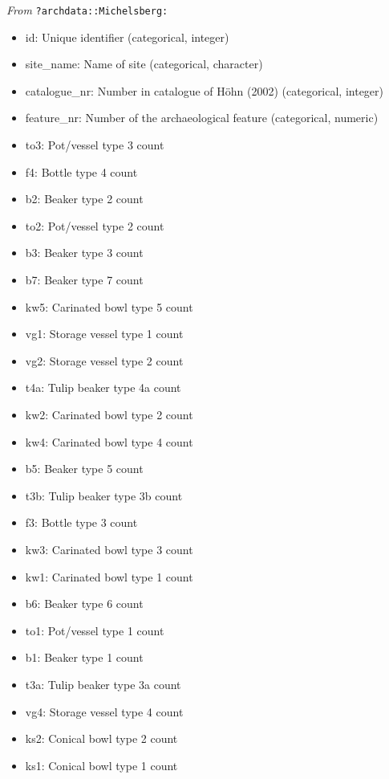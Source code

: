 \documentclass[8pt]{beamer}
\begin{document}
\begin{frame}
\bigskip

\textit{From} \verb|?archdata::Michelsberg:|

\begin{multicols}{3}

\begin{tiny}

\begin{itemize}
\item id: Unique identifier (categorical, integer)
\item site\_name: Name of site (categorical, character)
\item catalogue\_nr: Number in catalogue of Höhn (2002) (categorical, integer)
\item feature\_nr: Number of the archaeological feature (categorical, numeric)
\item to3: Pot/vessel type 3 count
\item f4: Bottle type 4 count
\item b2: Beaker type 2 count
\item to2: Pot/vessel type 2 count
\item b3: Beaker type 3 count
\item b7: Beaker type 7 count
\item kw5: Carinated bowl type 5 count
\item vg1: Storage vessel type 1 count
\item vg2: Storage vessel type 2 count
\item t4a: Tulip beaker type 4a count
\item kw2: Carinated bowl type 2 count
\item kw4: Carinated bowl type 4 count
\item b5: Beaker type 5 count
\item t3b: Tulip beaker type 3b count
\item f3: Bottle type 3 count
\item kw3: Carinated bowl type 3 count
\item kw1: Carinated bowl type 1 count
\item b6: Beaker type 6 count
\item to1: Pot/vessel type 1 count
\item b1: Beaker type 1 count
\item t3a: Tulip beaker type 3a count
\item vg4: Storage vessel type 4 count
\item ks2: Conical bowl type 2 count
\item ks1: Conical bowl type 1 count

\end{itemize}
\end{tiny}
\end{multicols}
\end{frame}
\end{document}
